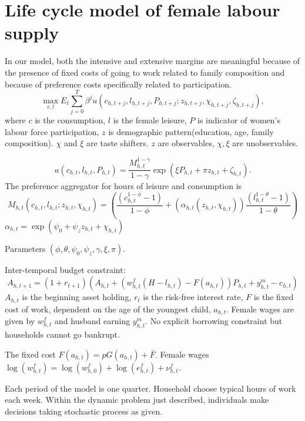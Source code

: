 \section{Life cycle model of female labour supply}
In our model, both the intensive and extensive margins are meaningful because of the presence of fixed costs of going to work related to family composition and because of preference costs specifically related to participation.
\[ \max_{c,l} E_t \sum_{j=0}^T \beta^j u(c_{h,t+j},l_{h,t+j},P_{h,t+j};z_{h,t+j},\chi_{h,t+j},\zeta_{h,t+j}), \]
where $c$ is the consumption, $l$ is the female leisure, $P$ is indicator of women's labour force participation, $z$ is demographic pattern(education, age, family composition). $\chi$ and $\xi$ are taste shifters.
$z$ are observables, $\chi,\xi$ are unobservables.

\[ u(c_{h,t},l_{h,t},P_{h,t}) = \frac{M^{1-\gamma}_{h,t}}{1 - \gamma} \exp{(\xi P_{h,t} + \pi z_{h,t} + \zeta_{h,t} )} .\]
The preference aggregator for hours of leisure and consumption is
\[ M_{h,t}(c_{h,t},l_{h,t};z_{h,t},\chi_{h,t}) = \left( \frac{(c_{h,t}^{1 - \phi} - 1)}{1 - \phi} + (\alpha_{h,t}(z_{h,t},\chi_{h,t})) \frac{(l_{h,t}^{1 - \theta} -1)}{ 1 - \theta}\right) \]
$\alpha_{h,t}= \exp{(\psi_0 + \psi_z z_{h,t} + \chi_{h,t})}$

Parameters  $(\phi,\theta,\psi_0,\psi_z,\gamma,\xi,\pi)$.

Inter-temporal budget constraint:
\[ A_{h,t+1} = (1 + r_{t+1}) \left( A_{h,t} + \left(w_{h,t}^f(H-l_{h,t}) - F(a_{h,t}) \right)P_{h,t} + y_{h,t}^m - c_{h,t} \right)\]
$A_{h,t}$ is the beginning asset holding, $r_t$ is the risk-free interest rate, $F$ is the fixed cost of work, dependent on the age of the youngest child, $a_{h,t}$. Female wages are given by $w_{h,t}^f$ and husband earning $y_{h,t}^m$.
No explicit borrowing constraint but households cannot go bankrupt.

The fixed cost $F(a_{h,t}) = p G(a_{h,t}) + \bar{F}$.
Female wages $\log(w_{h,t}^f ) = \log(w_{h,0}^f) + \log(e_{h,t}^f) + \nu_{h,t}^f $.

Each period of the model is one quarter. Household choose typical hours of work each week.
Within the dynamic problem just described, individuals make decisions taking stochastic process as given.
